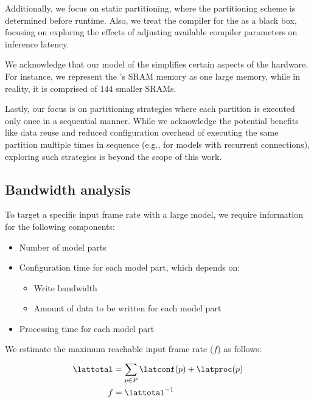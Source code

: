 Additionally, we focus on static partitioning, where the partitioning scheme is determined before runtime.
Also, we treat the compiler for the \graicore{} as a black box, focusing on exploring the effects of adjusting available compiler parameters on inference latency.

We acknowledge that our model of the \graicore{} simplifies certain aspects of the hardware.
For instance, we represent the \graicore{}'s SRAM memory as one large memory, while in reality, it is comprised of $144$ smaller SRAMs.

Lastly, our focus is on partitioning strategies where each partition is executed only once in a sequential manner.
While we acknowledge the potential benefits like data reuse and reduced configuration overhead of executing the same partition multiple times in sequence (e.g., for models with recurrent connections), exploring such strategies is beyond the scope of this work.


\subsection{Bandwidth analysis}
To target a specific input frame rate with a large model, we require information for the following components:
\begin{itemize}
    \item Number of model parts
    \item Configuration time for each model part, which depends on:
    \begin{itemize}
        \item Write bandwidth
        \item Amount of data to be written for each model part
    \end{itemize}
    \item Processing time for each model part
\end{itemize}

We estimate the maximum reachable input frame rate ($f$) as follows:
\begin{align*} 
    \lattotal &= \sum_{p \in P}^{}{\latconf(p) + \latproc(p)} \\
    f &= \lattotal^{-1}
\end{align*}

